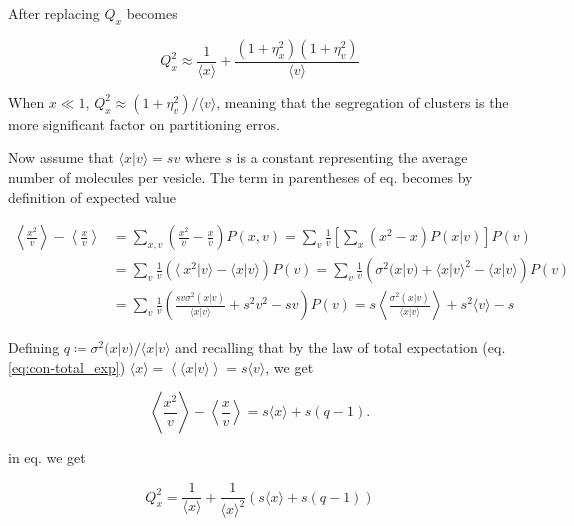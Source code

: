 After replacing $Q_x$ becomes

\begin{equation*}
  \boxed{Q_x^2 \approx \frac{1}{\langle x\rangle} + \frac{(1+\eta_x^2)(1+\eta_v^2)}{\langle v\rangle}}
\end{equation*}

When $x\ll 1$, $Q_x^2\approx(1+\eta_v^2)/\langle v\rangle$, meaning that the segregation of clusters is the more significant factor on partitioning erros.


Now assume that $\langle x|v\rangle = sv$ where $s$ is a constant representing the average number of molecules per vesicle. The term in parentheses of eq. \label{eq:div-clus-Qx2} becomes by definition of expected value

\begin{equation}
  \begin{split}
    \left\langle \frac{x^2}{v}\right\rangle-\left\langle \frac{x}{v}\right\rangle &= \sum_{x,v}\left( \frac{x^2}{v}- \frac{x}{v}\right)P(x,v) = \sum_v\frac{1}{v}\left[\sum_x\left(x^2- x\right)P(x|v)\right]P(v)\\
    &=\sum_v\frac{1}{v}\left(\langle\ x^2|v\rangle - \langle x|v\rangle\right)P(v)=\sum_v\frac{1}{v}\left(\sigma^2(x|v) + \langle x|v\rangle^2-\langle x|v\rangle\right)P(v)\\
    &=\sum_v\frac{1}{v}\left(\frac{sv\sigma^2(x|v)}{\langle x|v\rangle} + s^2v^2-sv\right)P(v) = s\left\langle\frac{\sigma^2(x|v)}{\langle x|v\rangle}\right\rangle + s^2\langle v\rangle - s
  \end{split}
\end{equation}

Defining $q\coloneqq\sigma^2(x|v)/\langle x|v\rangle$ and recalling that by the law of total expectation (eq. \eqref{eq:con-total_exp})  $\langle x\rangle = \left\langle\langle x|v\rangle\right\rangle = s\langle v\rangle$, we get

\begin{equation}
  \left\langle \frac{x^2}{v}\right\rangle-\left\langle \frac{x}{v}\right\rangle = s\langle x\rangle+s(q-1).
\end{equation}

 in eq. \label{eq:div-clus-Qx2} we get

\begin{equation}
  Q_x^2 = \frac{1}{\langle x\rangle} + \frac{1}{\langle x\rangle^2}\left(s\langle x\rangle+s(q-1)\right)
\end{equation}


